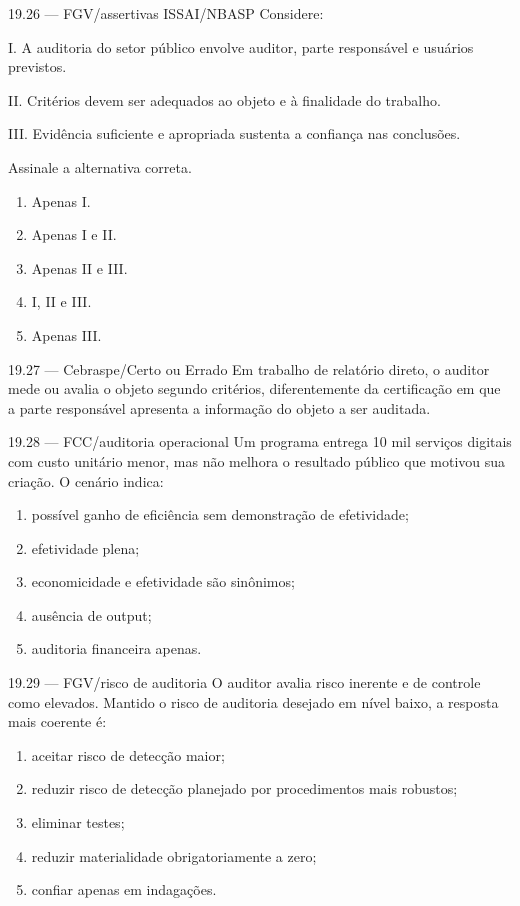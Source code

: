 \begin{questao}{ 19.26 — FGV/assertivas ISSAI/NBASP}
Considere:

I. A auditoria do setor público envolve auditor, parte responsável e usuários previstos.

II. Critérios devem ser adequados ao objeto e à finalidade do trabalho.

III. Evidência suficiente e apropriada sustenta a confiança nas conclusões.

Assinale a alternativa correta.
\begin{enumerate}[label=\Alph*)]
\item Apenas I.
\item Apenas I e II.
\item Apenas II e III.
\item I, II e III.
\item Apenas III.
\end{enumerate}
\end{questao}

\begin{questao}{ 19.27 — Cebraspe/Certo ou Errado}
Em trabalho de relatório direto, o auditor mede ou avalia o objeto segundo critérios, diferentemente da certificação em que a parte responsável apresenta a informação do objeto a ser auditada.
\end{questao}

\begin{questao}{ 19.28 — FCC/auditoria operacional}
Um programa entrega 10 mil serviços digitais com custo unitário menor, mas não melhora o resultado público que motivou sua criação. O cenário indica:
\begin{enumerate}[label=\Alph*)]
\item possível ganho de eficiência sem demonstração de efetividade;
\item efetividade plena;
\item economicidade e efetividade são sinônimos;
\item ausência de output;
\item auditoria financeira apenas.
\end{enumerate}
\end{questao}

\begin{questao}{ 19.29 — FGV/risco de auditoria}
O auditor avalia risco inerente e de controle como elevados. Mantido o risco de auditoria desejado em nível baixo, a resposta mais coerente é:
\begin{enumerate}[label=\Alph*)]
\item aceitar risco de detecção maior;
\item reduzir risco de detecção planejado por procedimentos mais robustos;
\item eliminar testes;
\item reduzir materialidade obrigatoriamente a zero;
\item confiar apenas em indagações.
\end{enumerate}
\end{questao}

